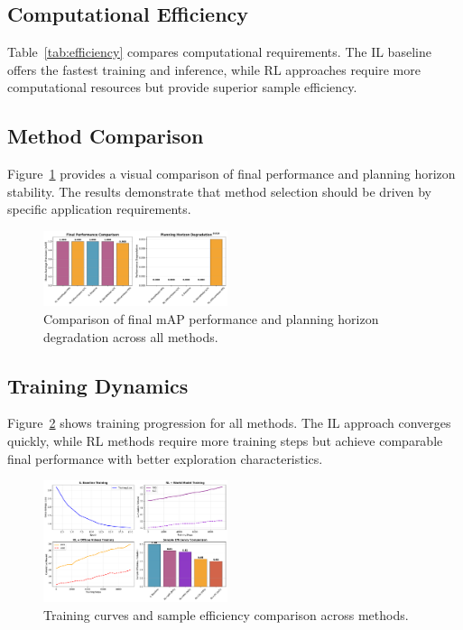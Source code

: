 \documentclass[conference]{IEEEtran}
\begin{document}
\subsection{Computational Efficiency}

Table~\ref{tab:efficiency} compares computational requirements. The IL baseline offers the fastest training and inference, while RL approaches require more computational resources but provide superior sample efficiency.



\subsection{Method Comparison}

Figure~\ref{fig:method_comparison} provides a visual comparison of final performance and planning horizon stability. The results demonstrate that method selection should be driven by specific application requirements.

\begin{figure}[htbp]
\centering
\includegraphics[width=0.48\textwidth]{figures/method_comparison.pdf}
\caption{Comparison of final mAP performance and planning horizon degradation across all methods.}
\label{fig:method_comparison}
\end{figure}

\subsection{Training Dynamics}

Figure~\ref{fig:training_curves} shows training progression for all methods. The IL approach converges quickly, while RL methods require more training steps but achieve comparable final performance with better exploration characteristics.

\begin{figure}[htbp]
\centering
\includegraphics[width=0.48\textwidth]{figures/training_curves.pdf}
\caption{Training curves and sample efficiency comparison across methods.}
\label{fig:training_curves}
\end{figure}
\end{document}
